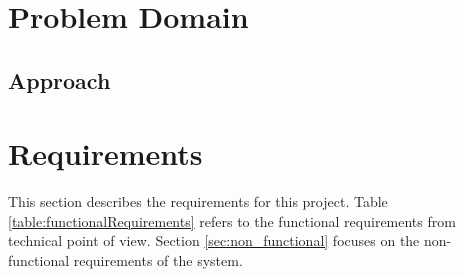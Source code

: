 \documentclass{pdfmx4020}
\begin{document}

\chapter{Problem Domain}
  \section{Approach} %
  \label{sec:approach}
  

\chapter{Requirements}
This section describes the requirements for this project. Table \ref{table:functionalRequirements} refers to the functional requirements from technical point of view. Section \ref{sec:non_functional} focuses on the non-functional requirements of the system. 
\end{document}
